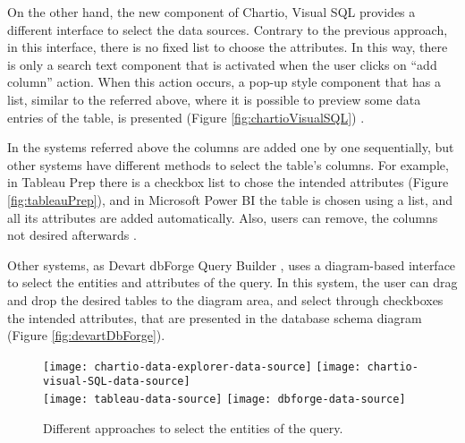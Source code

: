 On the other hand, the new component of Chartio, Visual SQL provides a different interface to select the data sources. Contrary to the previous approach, in this interface, there is no fixed list to choose the attributes. In this way, there is only a search text component that is activated when the user clicks on “add column” action. When this action occurs, a pop-up style component that has a list, similar to the referred above, where it is possible to preview some data entries of the table, is presented (Figure \ref{fig:chartioVisualSQL}) \cite{chartioVisualSQL}. 

In the systems referred above the columns are added one by one sequentially, but other systems have different methods to select the table’s columns. For example, in Tableau Prep \cite{tableauPrep} there is a checkbox list to chose the intended attributes (Figure \ref{fig:tableauPrep}), and in Microsoft Power BI \cite{powerBI} the table is chosen using a list, and all its attributes are added automatically. Also, users can remove, the columns not desired afterwards \cite{tableauPrepHelpWhatsNew,powerBIShapeAndCombineData}.

Other systems, as Devart dbForge Query Builder \cite{dbForgeQueryBuilder}, uses a diagram-based interface to select the entities and attributes of the query. In this system, the user can drag and drop the desired tables to the diagram area, and select through checkboxes the intended attributes, that are presented in the database schema diagram (Figure \ref{fig:devartDbForge}).


\begin{figure}[htbp]
    \centering
      {\texttt{[image: chartio-data-explorer-data-source]}}%
      {\texttt{[image: chartio-visual-SQL-data-source]}}%
      \\
    {\texttt{[image: tableau-data-source]}}%
    {\texttt{[image: dbforge-data-source]}}%
  \caption{Different approaches to select the entities of the query.}
    \label{fig:approaches_select_data_sources}
  \end{figure}

